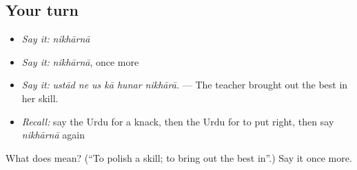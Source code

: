 \subsection*{Your turn}
\begin{itemize}
\raggedright
  \item \emph{Say it:} \emph{nikhārnā}
  \item \emph{Say it:} \emph{nikhārnā}, once more
  \item \emph{Say it:} \emph{ustād ne us kā hunar nikhārā.} — The teacher brought out the best in her skill.
  \item \emph{Recall:} say the Urdu for a knack, then the Urdu for to put right, then say \emph{nikhārnā} again
\end{itemize}

\begin{tcolorbox}[breakable,colback=teal!4,colframe=teal!35!black,title={Before you move on}]
What does  mean? (\textquotedblleft{}To polish a skill; to bring out the best in\textquotedblright{}.) Say it once more.
\end{tcolorbox}
